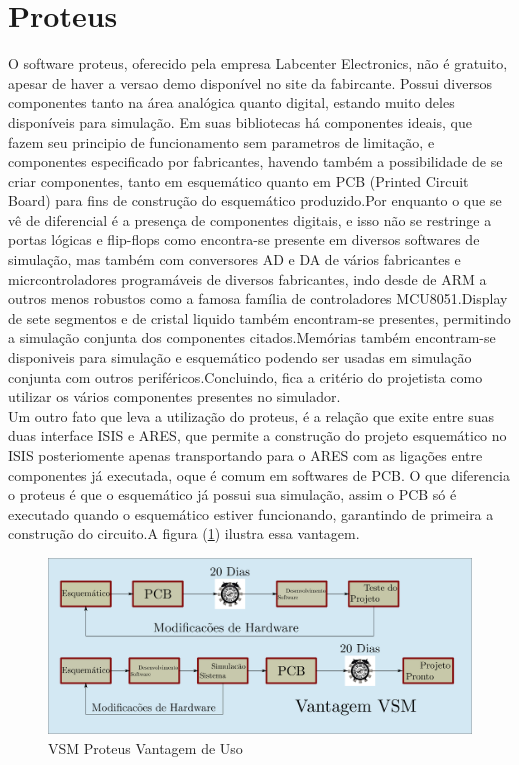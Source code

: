 \documentclass{Fabiano_file}
\begin{document}
\section{Proteus}
O software proteus, oferecido pela empresa Labcenter Electronics, não é gratuito, apesar de haver a versao demo disponível no site da fabircante.
Possui diversos componentes tanto na área analógica quanto digital, estando muito deles disponíveis para simulação.
Em suas bibliotecas há componentes ideais, que fazem seu principio de funcionamento sem parametros de limitação, e componentes especificado por fabricantes, 
havendo também a possibilidade de se criar componentes, tanto em esquemático quanto em PCB (Printed Circuit Board) para fins de construção do esquemático 
produzido.Por enquanto o que se vê de diferencial é a presença de componentes digitais, e isso não se restringe a portas lógicas e flip-flops como 
encontra-se presente em diversos softwares de simulação, mas também com conversores AD e DA de vários fabricantes e micrcontroladores programáveis de 
diversos fabricantes, indo desde de ARM a outros menos robustos como a famosa família de controladores MCU8051.Display de sete segmentos e de cristal 
liquido também encontram-se presentes, permitindo a simulação  conjunta dos componentes citados.Memórias também encontram-se disponiveis para simulação 
e esquemático podendo ser usadas em simulação conjunta com outros periféricos.Concluindo, fica a critério do projetista como utilizar os vários componentes 
presentes no simulador.\\
Um outro fato que leva a utilização do proteus, é a relação que exite entre suas duas interface ISIS e ARES, que permite a construção do projeto esquemático
no ISIS posteriomente apenas transportando para o ARES com as ligações entre componentes já executada, oque é comum em softwares de PCB.
O que diferencia  o proteus é que o esquemático já possui sua simulação, assim o PCB só é executado quando o esquemático estiver funcionando, 
garantindo de primeira a construção do circuito.A figura (\ref{fig:Simulacao_proteus_esquematico_PCB}) ilustra essa vantagem.\\

\begin{figure}[h!]
\centering
\includegraphics[width=1\textwidth]{Simulacao_proteus_esquematico_PCB.pdf}
\caption{VSM Proteus Vantagem de Uso}
\label{fig:Simulacao_proteus_esquematico_PCB}
\end{figure}
\end{document}
